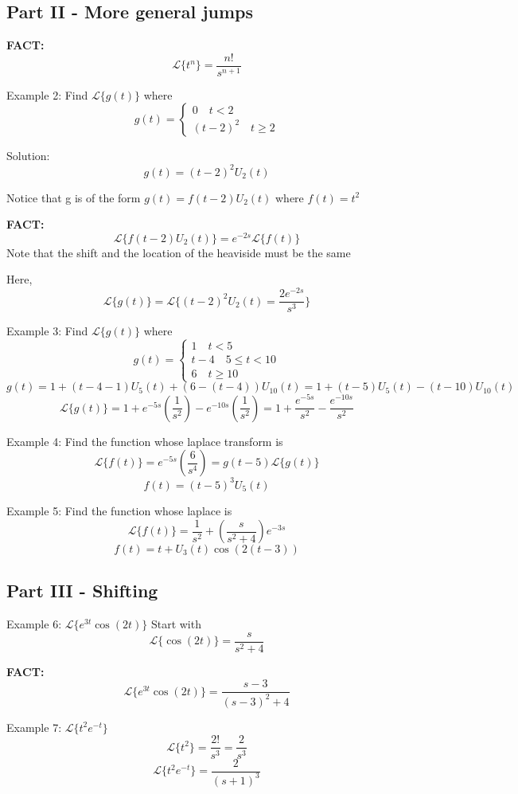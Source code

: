 \documentclass[12pt]{article}
\renewcommand{\L}[1]{\mathcal{L}\{#1\}}
\begin{document}
\subsection*{Part II - More general jumps}
\textbf{FACT:}
\[\L{t^n} = \frac{n!}{s^{n+1}}\]

Example 2: Find $\L{g(t)}$ where 
\[g(t) = \begin{cases}
    0 \quad t < 2\\
    (t - 2)^2 \quad t \geq 2
\end{cases}\]

Solution:
\[g(t) = (t - 2)^2 U_2(t)\]

Notice that g is of the form $g(t) = f(t - 2)U_2(t)$ where $f(t) = t^2$

\textbf{FACT:}
\[\L{f(t - 2)U_2(t)} = e^{-2s} \L{f(t)}\]
Note that the shift and the location of the heaviside must be the same  

Here, 
\[\L{g(t)} = \L{(t - 2)^2 U_2(t) = \boxed{\frac{2e^{-2s}}{s^3}}}\]

Example 3: Find $\L{g(t)}$ where 
\[g(t) = \begin{cases}
    1 \quad t < 5\\
    t - 4 \quad 5 \leq t < 10\\
    6 \quad t \geq 10
\end{cases}\]
\[g(t) = 1 + (t- 4 - 1)U_5(t) + (6 - (t - 4))U_{10}(t) = 1 + (t - 5)U_5(t) - (t - 10)U_10(t)\]
\[\L{g(t)} = 1 + e^{-5s}\left(\frac{1}{s^2}\right) - e^{-10s}\left(\frac{1}{s^2}\right) = \boxed{1 + \frac{e^{-5s}}{s^2} - \frac{e^{-10s}}{s^2}}\]

Example 4: Find the function whose laplace transform is 
\[\L{f(t)} = e^{-5s} \left(\frac{6}{s^4}\right) = g(t - 5) \L{g(t)} \]
\[\boxed{f(t) = (t - 5)^3 U_5(t)}\]

Example 5: Find the function whose laplace is 
\[\L{f(t)} = \frac{1}{s^2} + \left(\frac{s}{s^2 + 4}\right) e^{-3s}\]
\[\boxed{f(t) = t + U_3(t)\cos(2(t - 3))}\]

\subsection*{Part III - Shifting}
Example 6: $\L{e^{3t} \cos (2t)}$
Start with 
\[\L{\cos(2t)} = \frac{s}{s^2 + 4}\]

\textbf{FACT:}
\[\boxed{\L{e^{3t} \cos(2t)} = \frac{s - 3}{(s - 3)^2 + 4}}\]

Example 7: $\L{t^2 e^{-t}}$
\[\L{t^2} = \frac{2!}{s^3} = \frac{2}{s^3}\]
\[\boxed{\L{t^2 e^{-t}} = \frac{2}{(s + 1)^3}}\]
\end{document}
